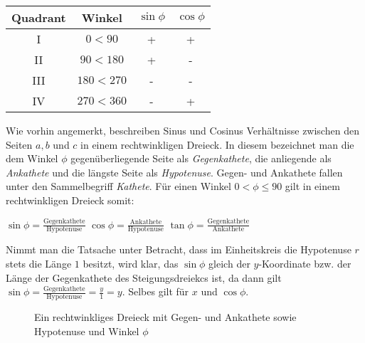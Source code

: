 \begin{table}[h!]
	\begin{tabular}{c | c | c | c}
		Quadrant & Winkel & $\sin \phi$ & $\cos \phi$
		\\ \hline
		I & $0 < 90$ & + & +
		\\ 
		II & $90 < 180$ & + & -
		\\
		III & $180 < 270$ & - & -
		\\
		IV & $270 < 360$ & - & +
		\\
	\end{tabular}
\end{table}

\pagebreak


Wie vorhin angemerkt, beschreiben Sinus und Cosinus Verh\"{a}ltnisse zwischen den Seiten $a, b$ und $c$ in einem rechtwinkligen Dreieck. In diesem bezeichnet man die dem Winkel $\phi$ gegen\"{u}berliegende Seite als \emph{Gegenkathete}, die anliegende als \emph{Ankathete} und die l\"{a}ngste Seite als \emph{Hypotenuse}. Gegen- und Ankathete fallen unter den Sammelbegriff \emph{Kathete}. F\"{u}r einen Winkel $0 < \phi \leq 90$ gilt in einem rechtwinkligen Dreieck somit:

\begin{center}
$\sin \phi = \frac{\text{Gegenkathete}}{\text{Hypotenuse}}$
\hspace{1cm}
$\cos \phi = \frac{\text{Ankathete}}{\text{Hypotenuse}}$
\hspace{1cm}
$\tan \phi = \frac{\text{Gegenkathete}}{\text{Ankathete}}$
\end{center}

Nimmt man die Tatsache unter Betracht, dass im Einheitskreis die Hypotenuse $r$ stets die L\"{a}nge $1$ besitzt, wird klar, das $\sin \phi$ gleich der $y$-Koordinate bzw. der L\"{a}nge der Gegenkathete des Steigungsdreiekcs ist, da dann gilt $\sin \phi = \frac{\text{Gegenkathete}}{\text{Hypotenuse}} = \frac{y}{1} = y$. Selbes gilt f\"{u}r $x$ und $\cos \phi$.


\begin{figure}[h!]
	\caption*{Ein rechtwinkliges Dreieck mit Gegen- und Ankathete sowie Hypotenuse und Winkel $\phi$}
\end{figure}

